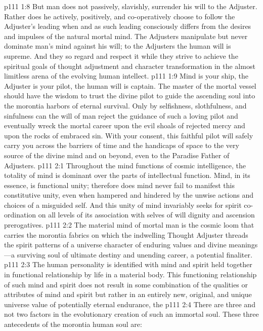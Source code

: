 \vs p111 1:8 But man does not passively, slavishly, surrender his will to the Adjuster. Rather does he actively, positively, and co\hyp{}operatively choose to follow the Adjuster’s leading when and as such leading consciously differs from the desires and impulses of the natural mortal mind. The Adjusters manipulate but never dominate man’s mind against his will; to the Adjusters the human will is supreme. And they so regard and respect it while they strive to achieve the spiritual goals of thought adjustment and character transformation in the almost limitless arena of the evolving human intellect.
\pc \vs p111 1:9 Mind is your ship, the Adjuster is your pilot, the human will is captain. The master of the mortal vessel should have the wisdom to trust the divine pilot to guide the ascending soul into the morontia harbors of eternal survival. Only by selfishness, slothfulness, and sinfulness can the will of man reject the guidance of such a loving pilot and eventually wreck the mortal career upon the evil shoals of rejected mercy and upon the rocks of embraced sin. With your consent, this faithful pilot will safely carry you across the barriers of time and the handicaps of space to the very source of the divine mind and on beyond, even to the Paradise Father of Adjusters.
\vs p111 2:1 Throughout the mind functions of cosmic intelligence, the totality of mind is dominant over the parts of intellectual function. Mind, in its essence, is functional unity; therefore does mind never fail to manifest this constitutive unity, even when hampered and hindered by the unwise actions and choices of a misguided self. And this unity of mind invariably seeks for spirit co\hyp{}ordination on all levels of its association with selves of will dignity and ascension prerogatives.
\vs p111 2:2 The material mind of mortal man is the cosmic loom that carries the morontia fabrics on which the indwelling Thought Adjuster threads the spirit patterns of a universe character of enduring values and divine meanings---a surviving soul of ultimate destiny and unending career, a potential finaliter.
\vs p111 2:3 The human personality is identified with mind and spirit held together in functional relationship by life in a material body. This functioning relationship of such mind and spirit does not result in some combination of the qualities or attributes of mind and spirit but rather in an entirely new, original, and unique universe value of potentially eternal endurance, the 
\pc \vs p111 2:4 There are three and not two factors in the evolutionary creation of such an immortal soul. These three antecedents of the morontia human soul are:
